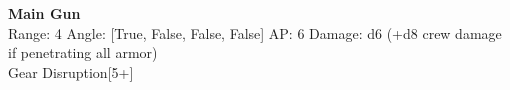 {\bf Main Gun } \\



Range: 4  Angle: [True, False, False, False] AP: 6 Damage: d6 (+d8 crew damage if penetrating all armor) \\
Gear Disruption[5+]\\ 




 
\ \\













